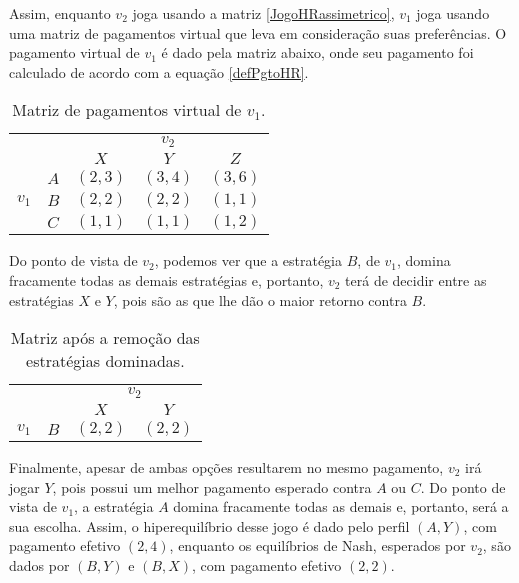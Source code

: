 Assim, enquanto $v_2$ joga usando a matriz \eqref{JogoHRassimetrico}, $v_1$ joga usando uma matriz de pagamentos virtual que leva em consideração suas preferências. O pagamento virtual de $v_1$ é dado pela matriz abaixo, onde seu pagamento foi calculado de acordo com a equação \eqref{defPgtoHR}.

\begin{table}[h]
\begin{center}
    \begin{tabular}{ccccc}
        & & \multicolumn{3}{c}{$v_2$} \\
        & & $X$ & $Y$ & $Z$ \\ \cline{3-5} 
        \multirow{3}{*}{$v_1$} & \multicolumn{1}{c|}{$A$} & \multicolumn{1}{l|}{$(2,3)$} & \multicolumn{1}{l|}{$(3,4)$} & \multicolumn{1}{l|}{$(3,6)$} \\ \cline{3-5} 
        & \multicolumn{1}{c|}{$B$} & \multicolumn{1}{l|}{$(2,2)$}  & \multicolumn{1}{l|}{$(2,2)$} & \multicolumn{1}{l|}{$(1,1)$}  \\ \cline{3-5} 
        & \multicolumn{1}{l|}{$C$} & \multicolumn{1}{l|}{$(1,1)$}  & \multicolumn{1}{l|}{$(1,1)$} & \multicolumn{1}{l|}{$(1,2)$} \\ \cline{3-5} 
    \end{tabular}
    \caption{Matriz de pagamentos virtual de $v_1$.}
    \label{PagVirtualV1}
\end{center}
\end{table}

Do ponto de vista de $v_2$, podemos ver que a estratégia $B$, de $v_1$, domina fracamente todas as demais estratégias e, portanto, $v_2$ terá de decidir entre as estratégias $X$ e $Y$, pois são as que lhe dão o maior retorno contra $B$.

\begin{table}[h]
\begin{center}
    \begin{tabular}{cccc}
        & & \multicolumn{2}{c}{$v_2$} \\
        & & $X$ & $Y$ \\ \cline{3-4} 
        $v_1$ & \multicolumn{1}{c|}{$B$} & \multicolumn{1}{l|}{$(2,2)$}  & \multicolumn{1}{l|}{$(2,2)$}  \\ \cline{3-4} 
    \end{tabular}
    \caption{Matriz após a remoção das estratégias dominadas.}
\end{center}
\end{table}

Finalmente, apesar de ambas opções resultarem no mesmo pagamento, $v_2$ irá jogar $Y$, pois possui um melhor pagamento esperado contra $A$ ou $C$. Do ponto de vista de $v_1$, a estratégia $A$ domina fracamente todas as demais e, portanto, será a sua escolha. Assim, o hiperequilíbrio desse jogo é dado pelo perfil $(A,Y)$, com pagamento efetivo $(2,4)$, enquanto os equilíbrios de Nash, esperados por $v_2$, são dados por $(B,Y)$ e $(B,X)$, com pagamento efetivo $(2,2)$.

